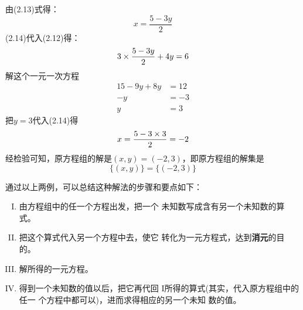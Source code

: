 \begin{solution}
由(2.13)式得：
\begin{equation}
    x=\frac{5-3y}{2}
\end{equation}
(2.14)代入(2.12)得：
\[3\times \dfrac{5-3y}{2}+4y=6 \]
解这个一元一次方程
\[\begin{split}
    15-9y+8y&=12\\
    -y&=-3\\
    y&=3
\end{split}\]
把$y=3$代入(2.14)得
\[x=\dfrac{5-3\times 3}{2}=-2\]
经检验可知，原方程组的解是$(x,y)=(-2,3)$，即原方程组的解集是
\[\{(x,y)\}=\{(-2,3)\} \]
\end{solution}

通过以上两例，可以总结这种解法的步骤和要点如下：
\begin{blk}{}
\begin{enumerate}[I. ]
    \item 由方程组中的任一个方程出发，把一个
    未知数写成含有另一个未知数的算式。
    \item 把这个算式代入另一个方程中去，使它
    转化为一元方程式，达到\textbf{消元}的目的。
    \item 解所得的一元方程。
    \item 得到一个未知数的值以后，把它再代回
    I所得的算式(其实，代入原方程组中的任一
    个方程中都可以)，进而求得相应的另一个未知
    数的值。
\end{enumerate}    
\end{blk}

